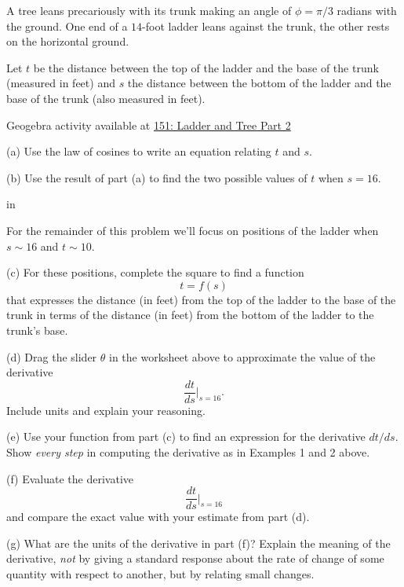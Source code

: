 \documentclass{ximera}
\newcommand{\pskip}{\vskip 0.1 in}
\begin{document}
\begin{question}  \label{Q:df0g43rb4}
A tree leans precariously with its trunk making an angle of $\phi = \pi/3$ radians with the ground. One end of a $14$-foot ladder leans against the trunk, the other rests on the horizontal ground.

Let $t$ be the distance between the top of the ladder and the base of the trunk (measured in feet) and $s$ the distance between the bottom of the ladder and the base of the trunk (also measured in feet).

\begin{onlineOnly}
    \begin{center}
\end{center}
\end{onlineOnly}

Geogebra activity available at \href{https://www.geogebra.org/classic/ctf2bcqz}{151: Ladder and Tree Part 2}


(a) Use the law of cosines to write an equation relating $t$ and $s$.

(b) Use the result of part (a) to find the two possible values of $t$ when $s=16$. 

\pskip

For the remainder of this problem we'll focus on positions of the ladder when $s \sim 16$ and $t\sim 10$. 

(c) For these positions, complete the square to find a function 
\[
    t = f(s)
\]
that expresses the distance (in feet) from the top of the ladder to the base of the trunk in terms of the distance (in feet) from the bottom of the ladder to the trunk's base.

(d) Drag the slider $\theta$ in the worksheet above to approximate the value of the derivative
\[
     \frac{dt}{ds}\Big|_{s=16} .
\]
Include units and explain your reasoning. %

(e) Use your function from part (c) to find an expression for the derivative $dt/ds$. Show \emph{every step} in computing the derivative as in Examples 1 and 2 above.

(f) Evaluate the derivative 
\[
       \frac{dt}{ds}\Big|_{s=16} 
\]
and compare the exact value with your estimate from part (d). 

(g) What are the units of the derivative in part (f)? Explain the meaning of the derivative, \emph{not} by giving a standard response about the rate of change of some quantity with respect to another, but by relating small changes.


\end{question}
\end{document}
